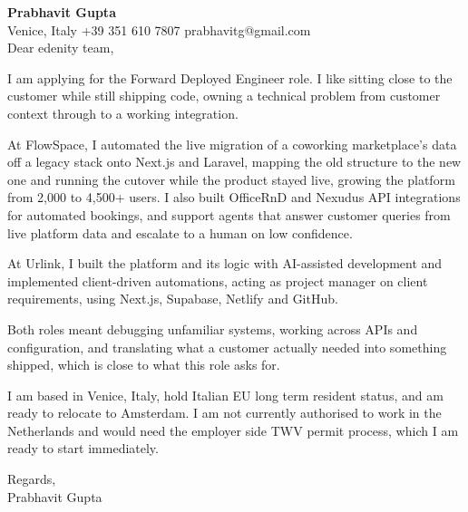 \documentclass[a4paper,10.5pt]{article}
\begin{document}
\textbf{Prabhavit Gupta}\\
Venice, Italy \textbar{} +39 351 610 7807 \textbar{} prabhavitg@gmail.com\\[10pt]
Dear edenity team,

I am applying for the Forward Deployed Engineer role. I like sitting close to the customer while still shipping code, owning a technical problem from customer context through to a working integration.

At FlowSpace, I automated the live migration of a coworking marketplace's data off a legacy stack onto Next.js and Laravel, mapping the old structure to the new one and running the cutover while the product stayed live, growing the platform from 2,000 to 4,500+ users. I also built OfficeRnD and Nexudus API integrations for automated bookings, and support agents that answer customer queries from live platform data and escalate to a human on low confidence.

At Urlink, I built the platform and its logic with AI-assisted development and implemented client-driven automations, acting as project manager on client requirements, using Next.js, Supabase, Netlify and GitHub.

Both roles meant debugging unfamiliar systems, working across APIs and configuration, and translating what a customer actually needed into something shipped, which is close to what this role asks for.

I am based in Venice, Italy, hold Italian EU long term resident status, and am ready to relocate to Amsterdam. I am not currently authorised to work in the Netherlands and would need the employer side TWV permit process, which I am ready to start immediately.

Regards,\\
Prabhavit Gupta
\end{document}
